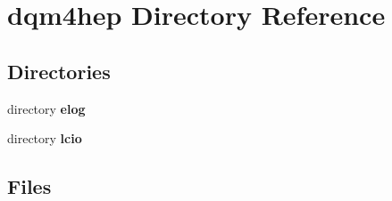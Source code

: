 \section{dqm4hep Directory Reference}
\label{dir_dc33e8f5d29e23248e7e620fc03f4944}
\subsection*{Directories}
\begin{DoxyCompactItemize}
\item 
directory {\bf elog}
\item 
directory {\bf lcio}
\end{DoxyCompactItemize}
\subsection*{Files}

